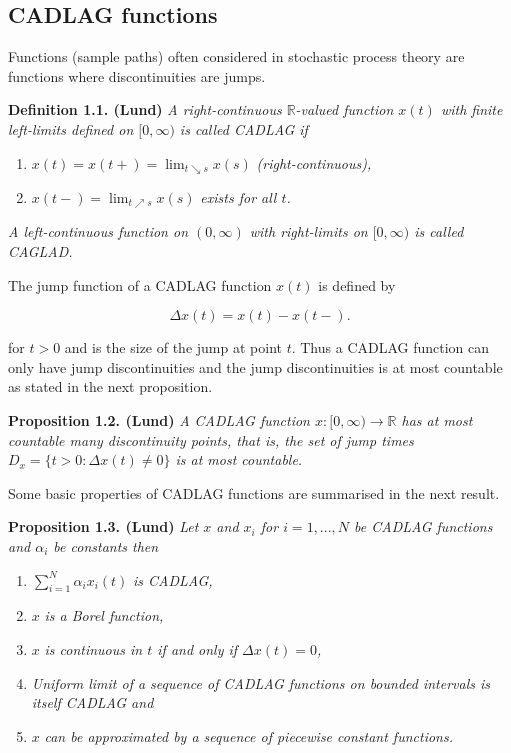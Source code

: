 \documentclass[a4paper,12pt,openany]{book}
\providecommand{\tightlist}{%
 \setlength{\itemsep}{0pt}\setlength{\parskip}{0pt}}
\begin{document}
\hypertarget{cadlag-functions}{%
\subsection{CADLAG functions}\label{cadlag-functions}}

Functions (sample paths) often considered in stochastic process theory are functions where discontinuities are jumps.

\textbf{Definition 1.1. (Lund)} \emph{A right-continuous \(\mathbb R\)-valued function \(x(t)\) with finite left-limits defined on \([0,\infty)\) is called CADLAG if}

\begin{enumerate}
\def\labelenumi{\roman{enumi})}
\tightlist
\item
  \(x(t)=x(t+)=\lim_{t\searrow s}x(s)\) \emph{(right-continuous),}
\item
  \(x(t-)=\lim_{t\nearrow s}x(s)\) \emph{exists for all \(t\).}
\end{enumerate}

\emph{A left-continuous function on \((0,\infty)\) with right-limits on \([0, \infty)\) is called CAGLAD.}

The jump function of a CADLAG function \(x(t)\) is defined by

\[
\Delta x(t)=x(t)-x(t-).
\]

for \(t>0\) and is the size of the jump at point \(t\). Thus a CADLAG function can only have jump discontinuities and the jump discontinuities is at most countable as stated in the next proposition.

\textbf{Proposition 1.2. (Lund)} \emph{A CADLAG function \(x : [0, \infty) \to \mathbb R\) has at most countable many discontinuity points, that is, the set of jump times \(D_x = \{t > 0 : \Delta x(t)\ne 0\}\) is at most countable.}

Some basic properties of CADLAG functions are summarised in the next result.

\textbf{Proposition 1.3. (Lund)} \emph{Let \(x\) and \(x_i\) for \(i=1,...,N\) be CADLAG functions and \(\alpha_i\) be constants then}

\begin{enumerate}
\def\labelenumi{\roman{enumi})}
\tightlist
\item
  \(\sum_{i=1}^N \alpha_ix_i(t)\) \emph{is CADLAG,}
\item
  \(x\) \emph{is a Borel function,}
\item
  \(x\) \emph{is continuous in \(t\) if and only if \(\Delta x(t)=0\),}
\item
  \emph{Uniform limit of a sequence of CADLAG functions on bounded intervals is itself CADLAG and}
\item
  \(x\) \emph{can be approximated by a sequence of piecewise constant functions.}
\end{enumerate}
\end{document}
